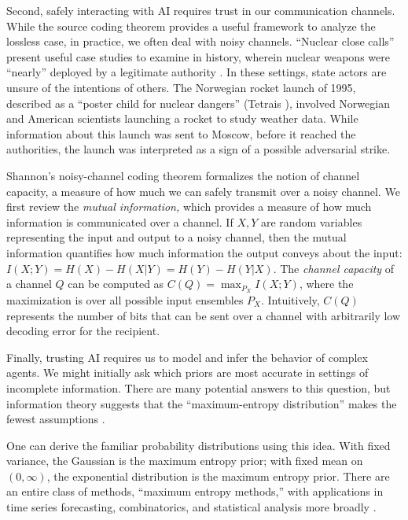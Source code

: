\documentclass[11pt]{article}
\begin{document}
Second, safely interacting with AI requires trust in our communication channels.  While the source coding theorem provides a useful framework to analyze the lossless case, in practice, we often deal with noisy channels.  ``Nuclear close calls'' present useful case studies to examine in history, wherein nuclear weapons were ``nearly'' deployed by a legitimate authority \cite{tertrais2017brink}.  In these settings, state actors are unsure of the intentions of others.  The Norwegian rocket launch of 1995, described as a ``poster child for nuclear dangers'' (Tetrais \cite{tertrais2017brink}), involved Norwegian and American scientists launching a rocket to study weather data.  While information about this launch was sent to Moscow, before it reached the authorities, the launch was interpreted as a sign of a possible adversarial strike.

Shannon's noisy-channel coding theorem formalizes the notion of channel capacity, a measure of how much we can safely transmit over a noisy channel.  We first review the {\it mutual information,} which provides a measure of how much information is communicated over a channel.  If $X, Y$ are random variables representing the input and output to a noisy channel, then the mutual information quantifies how much information the output conveys about the input: $I(X; Y) = H(X) - H(X | Y) = H(Y) - H(Y|X)$.  The {\it channel capacity} of a channel $Q$ can be computed as $C(Q) = \max_{P_X} I(X; Y)$, where the maximization is over all possible input ensembles $P_X$.  Intuitively, $C(Q)$ represents the number of bits that can be sent over a channel with arbitrarily low decoding error for the recipient.

Finally, trusting AI requires us to model and infer the behavior of complex agents.  We might initially ask which priors are most accurate in settings of incomplete information.  There are many potential answers to this question, but information theory suggests that the ``maximum-entropy distribution'' makes the fewest assumptions \cite{adi-maxent} \cite{mackay2003information}.  

One can derive the familiar probability distributions using this idea.  With fixed variance, the Gaussian is the maximum entropy prior; with fixed mean on $(0, \infty)$, the exponential distribution is the maximum entropy prior.  There are an entire class of methods, ``maximum entropy methods,'' with applications in time series forecasting, combinatorics, and statistical analysis more broadly \cite{jaynes1982rationale}\cite{jaynes2003probability}.
\end{document}
